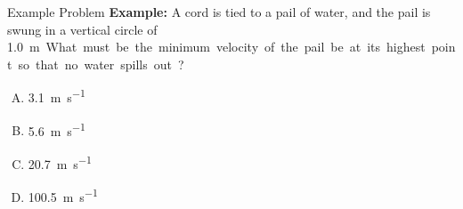 \documentclass[12pt,compress,aspectratio=169]{beamer}
\begin{document}
%    
%        
%    
%
%
%
%
%
%        



\begin{frame}{Example Problem}
  \textbf{Example:} A cord is tied to a pail of water, and the pail is swung
  in a vertical circle of \SI{1.0}\metre. What must be the minimum velocity of
  the pail be at its highest point so that no water spills out?
  \begin{enumerate}[(A)]
  \item\SI{3.1}{\metre\per\second}
  \item\SI{5.6}{\metre\per\second}
  \item\SI{20.7}{\metre\per\second}
  \item\SI{100.5}{\metre\per\second}
  \end{enumerate}
\end{frame}
\end{document}
